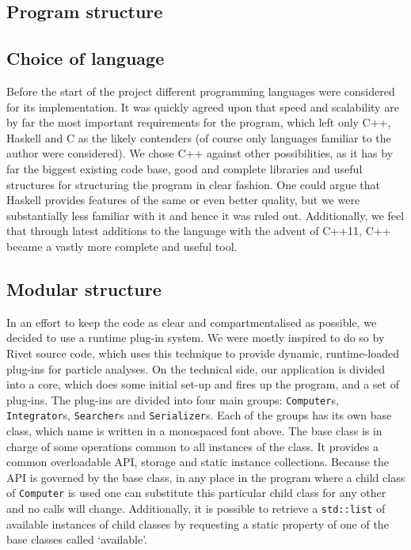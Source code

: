 \documentclass[11pt,a4paper]{article}
\begin{document}
\newpage
\begin{appendices}
    \section{Program structure}\label{app:struct}
    \subsection{Choice of language}
    Before the start of the project different programming languages were considered for its implementation.
    It was quickly agreed upon that speed and scalability are by far the most important requirements for the program, which left only C++, Haskell and C as the likely contenders (of course only languages familiar to the author were considered).
    We chose C++ against other possibilities, as it has by far the biggest existing code base, good and complete libraries and useful structures for structuring the program in clear fashion.
    One could argue that Haskell provides features of the same or even better quality, but we were substantially less familiar with it and hence it was ruled out.
    Additionally, we feel that through latest additions to the language with the advent of C++11, C++ became a vastly more complete and useful tool.

    \subsection{Modular structure}
    In an effort to keep the code as clear and compartmentalised as possible, we decided to use a runtime plug-in system.
    We were mostly inspired to do so by Rivet\cite{Rivet13} source code, which uses this technique to provide dynamic, runtime-loaded plug-ins for particle analyses.
    On the technical side, our application is divided into a core, which does some initial set-up and fires up the program, and a set of plug-ins.
    The plug-ins are divided into four main groups: \texttt{Computer}s, \texttt{Integrator}s, \texttt{Searcher}s and \texttt{Serializer}s.
    Each of the groups has its own base class, which name is written in a monospaced font above.
    The base class is in charge of some operations common to all instances of the class.
    It provides a common overloadable API, storage and static instance collections.
    Because the API is governed by the base class, in any place in the program where a child class of \texttt{Computer} is used one can substitute this particular child class for any other and no calls will change.
    Additionally, it is possible to retrieve a \texttt{std::list} of available instances of child classes by requesting a static property of one of the base classes called `available'.


\end{appendices}
\end{document}
